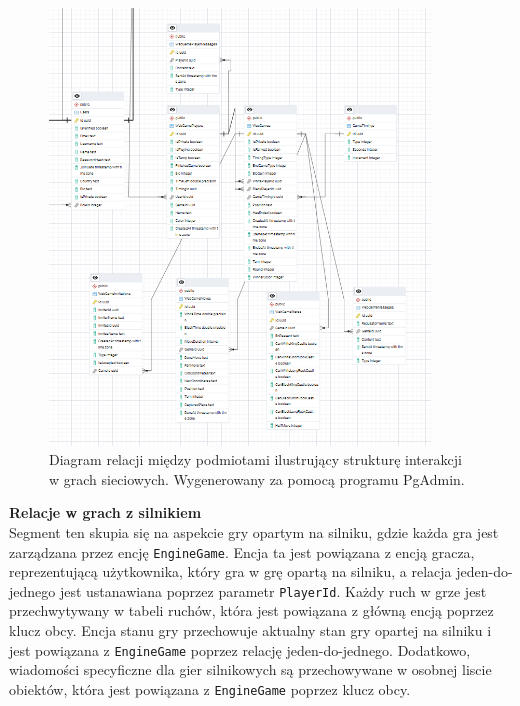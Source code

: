 \documentclass[12pt,a4paper]{article}
\begin{document}
\vspace{0.5cm}
\begin{figure}[h!]
    \centering
    \includegraphics[width=0.9\textwidth]{images/ERD_online.png}
    \caption{Diagram relacji między podmiotami ilustrujący strukturę interakcji w grach sieciowych. Wygenerowany za pomocą programu PgAdmin.}
\end{figure}

\newpage

\noindent \textbf{Relacje w grach z silnikiem}\\
Segment ten skupia się na aspekcie gry opartym na silniku, gdzie każda gra jest zarządzana przez encję \texttt{EngineGame}. Encja ta jest powiązana z encją gracza, reprezentującą użytkownika, który gra w grę opartą na silniku, a relacja jeden-do-jednego jest ustanawiana poprzez parametr \texttt{PlayerId}. Każdy ruch w grze jest przechwytywany w tabeli ruchów, która jest powiązana z główną encją poprzez klucz obcy. Encja stanu gry przechowuje aktualny stan gry opartej na silniku i jest powiązana z \texttt{EngineGame} poprzez relację jeden-do-jednego. Dodatkowo, wiadomości specyficzne dla gier silnikowych są przechowywane w osobnej liscie obiektów, która jest powiązana z \texttt{EngineGame} poprzez klucz obcy.
\end{document}
